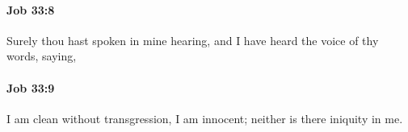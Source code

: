 		\paragraph{Job 33:8} %
			\label{JOB-33-8}

			Surely thou hast spoken in mine hearing, and I have heard the voice of thy words, saying,


		\paragraph{Job 33:9} %
			\label{JOB-33-9}

			I am clean without transgression, I am innocent; neither is there iniquity in me.


